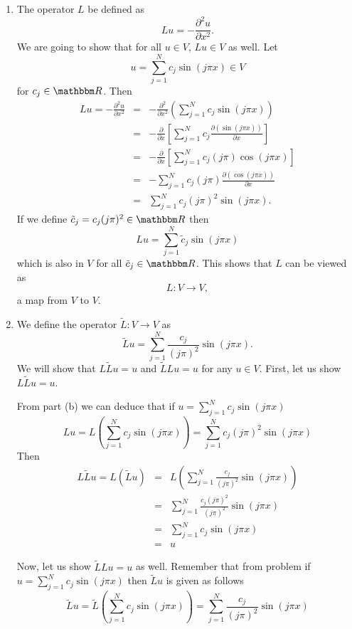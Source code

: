 \begin{solution}
\begin{enumerate}
\item The operator $L$ be defined as
\[
Lu = -\frac{\partial^2 u}{\partial x^2}.
\]
We are going to show that for all $u\in V$, $Lu\in V$ as well. Let
\[
u= \sum_{j = 1}^N c_j \sin( j \pi x) \in V 
\]
for $c_j \in \R$. Then
\begin{eqnarray*}
Lu = -\frac{\partial^2 u}{\partial x^2} &=& -\frac{\partial^2}{ \partial x^2}\left( \sum_{j = 1}^N c_j \sin( j \pi x)\right)\\
                               &=&-\frac{\partial}{\partial x}\left[ \sum_{j = 1}^N c_j \frac{\partial (\sin( j \pi x))}{\partial x} \right]\\
                               &=&-\frac{\partial}{\partial x}\left[ \sum_{j = 1}^N c_j (j \pi ) \cos( j \pi x)  \right]\\
                               &=& -\sum_{j = 1}^N c_j (j \pi ) \frac{ \partial {(\cos( j \pi x))}}{\partial x}\\
                               &=& \sum_{j = 1}^N c_j (j \pi )^2 \sin( j \pi x).
\end{eqnarray*}
If we define $\tilde{c}_j= c_j (j \pi )^2 \in \R$ then 
\[
Lu = \sum_{j = 1}^N \tilde{c}_j \sin( j \pi x)
\]
which is also in $V$ for all $ \tilde{c}_j \in \R$. This shows that $L$ can be viewed as 
\[
L: V\rightarrow V,
\]
a map from $V$ to $V$.

\item We define the operator $\tilde{L}: V\rightarrow V$ as
\[
\tilde{L} u =  \sum_{j = 1}^N \frac{c_j}{(j\pi)^2} \sin( j \pi x).
\]
We will show that $L\tilde{L}u = u$ and $\tilde{L}Lu = u$ for any $u\in V$. First, let us show $L\tilde{L}u = u$. 

From part (b) we can deduce that if $u= \sum_{j = 1}^N c_j \sin( j \pi x) $
\[
Lu= L\left(\sum_{j = 1}^N c_j \sin( j \pi x)\right)= \sum_{j = 1}^N c_j (j \pi )^2 \sin( j \pi x)
\]
Then
\begin{eqnarray*}
L\tilde{L}u = L (\tilde{L}u) &=& L \left(\sum_{j = 1}^N \frac{c_j}{(j\pi)^2} \sin( j \pi x)\right)\\
														 &=& \sum_{j = 1}^N \frac{c_j (j \pi)^2}{(j\pi)^2} \sin( j \pi x)\\
														 &=& \sum_{j = 1}^N c_j \sin( j \pi x)\\
														 &=&u
\end{eqnarray*}

Now, let us show $\tilde{L}Lu=u$ as well. Remember that from problem if $u= \sum_{j = 1}^N c_j \sin( j \pi x) $ then $\tilde{L}u$ is given as follows
\[
\tilde{L} u = \tilde{L}\left(\sum_{j = 1}^N c_j \sin( j \pi x)\right) = \sum_{j = 1}^N \frac{c_j}{(j\pi)^2} \sin( j \pi x)
\]


\end{enumerate}
\end{solution}
